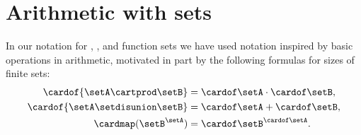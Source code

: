 \section{Arithmetic with sets}
\label{sec:arithmetic-with-sets}


In our notation for , , and function sets we have used notation inspired by basic operations in arithmetic, motivated in part by the following formulas for sizes of finite sets:
\begin{align}
    \cardof{\setA \cartprod \setB}     & = \cardof \setA \cdot \cardof \setB, \\
    \cardof{ \setA \setdisunion \setB} & = \cardof \setA + \cardof \setB, \\
    \cardmap(\setB^{\setA})            & = {\cardof\setB}^{\cardof\setA}.
\end{align}

